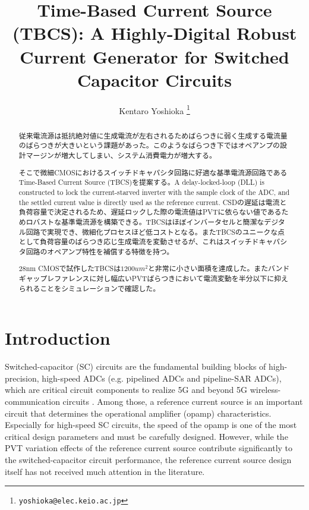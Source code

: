 \documentclass[letterpaper, 10 pt, conference]{ieeeconf}  %
\title{\LARGE \bf
Time-Based Current Source (TBCS): A Highly-Digital Robust Current Generator for Switched Capacitor Circuits
}
\author{Kentaro Yoshioka%
\thanks{
        {\tt\small yoshioka@elec.keio.ac.jp}}
}
\begin{document}
\maketitle
\thispagestyle{empty}
\pagestyle{empty}

\begin{abstract}
従来電流源は抵抗絶対値に生成電流が左右されるためばらつきに弱く生成する電流量のばらつきが大きいという課題があった。このようなばらつき下ではオペアンプの設計マージンが増大してしまい、システム消費電力が増大する。

そこで微細CMOSにおけるスイッチドキャパシタ回路に好適な基準電流源回路であるTime-Based Current Source (TBCS)を提案する。A delay-locked-loop (DLL) is constructed to lock the current-starved inverter with the sample clock of the ADC, and the settled current value is directly used as the reference current.
CSDの遅延は電流と負荷容量で決定されるため、遅延ロックした際の電流値はPVTに依らない値であるためロバストな基準電流源を構築できる。TBCSはほぼインバータセルと簡潔なデジタル回路で実現でき、微細化プロセスほど低コストとなる。またTBCSのユニークな点として負荷容量のばらつき応じ生成電流を変動させるが、これはスイッチドキャパシタ回路のオペアンプ特性を補償する特徴を持つ。

28nm CMOSで試作したTBCSは$1200um^2$と非常に小さい面積を達成した。またバンドギャップレファレンスに対し幅広いPVTばらつきにおいて電流変動を半分以下に抑えられることをシミュレーションで確認した。

\end{abstract}

\section{Introduction}

Switched-capacitor (SC) circuits are the fundamental building blocks of high-precision, high-speed ADCs (e.g. pipelined ADCs and pipeline-SAR ADCs), which are critical circuit components to realize 5G and beyond 5G wireless-communication circuits \cite{5g1, 5g2, ali201414, ali202012, lagos2018single, hung2020calibration}. Among those, a reference current source is an important circuit that determines the operational amplifier (opamp) characteristics. Especially for high-speed SC circuits, the speed of the opamp is one of the most critical design parameters and must be carefully designed. However, while the PVT variation effects of the reference current source contribute significantly to the switched-capacitor circuit performance, the reference current source design itself has not received much attention in the literature.
\end{document}
